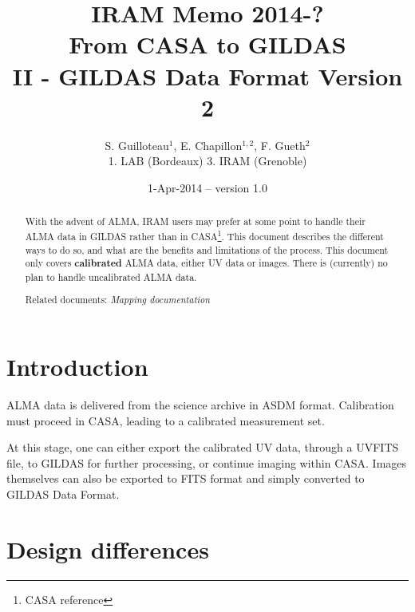 \documentclass[11pt]{article}
\title{IRAM Memo 2014-?\\[3\bigskipamount]
  From CASA to GILDAS \\
  II - GILDAS Data Format Version 2}
\author{S. Guilloteau$^{1}$, E. Chapillon$^{1,2}$, F. Gueth$^{2}$\\
 \vspace{0.5cm}
  1. LAB (Bordeaux)
  3. IRAM (Grenoble)}
\date{1-Apr-2014  --   version 1.0}
\begin{document}
\maketitle

%

\begin{abstract}
  With the advent of ALMA, IRAM users may prefer at some point to handle
  their ALMA data in GILDAS rather than in CASA\footnote{CASA reference}.
  This document describes the different ways to do so, and what are the
  benefits and limitations of the process.
  This document only covers \textbf{calibrated} ALMA data, either UV data 
  or images. There is (currently) no plan  to handle uncalibrated ALMA
  data.

  Related documents: \emph{Mapping documentation}
\end{abstract}

\newpage
\tableofcontents{}

\newpage

\section{Introduction}
%
ALMA data is delivered from the science archive in  ASDM format.
Calibration must proceed in CASA, leading to a calibrated measurement set.

At this stage, one can either export the calibrated UV data, through
a UVFITS file, to GILDAS for further processing, or continue imaging
within CASA.   Images themselves can also be exported to FITS format
and simply converted to GILDAS Data Format.


\section{Design differences}
\end{document}
